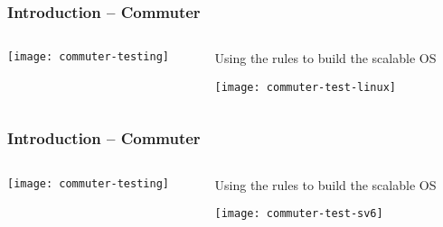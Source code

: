 \begin{frame}[plain]
	\frametitle{Introduction -- Commuter}
	
	
	\begin{columns}
		
		\begin{column}{.3\textwidth}	
			
			\texttt{[image: commuter-testing]}
			
			
		\end{column}
		
		\begin{column}{.7\textwidth}
			Using the rules to build the scalable OS
			\centering
			
			\texttt{[image: commuter-test-linux]}
			
		\end{column}
		
	\end{columns}
	
	
\end{frame}	


\begin{frame}[plain]
	\frametitle{Introduction -- Commuter}
	
	
	\begin{columns}
		
		\begin{column}{.3\textwidth}	
			
			\texttt{[image: commuter-testing]}
			
			
		\end{column}
		
		\begin{column}{.7\textwidth}
			Using the rules to build the scalable OS
			\centering
			
			\texttt{[image: commuter-test-sv6]}
			
		\end{column}
		
	\end{columns}
	
	
\end{frame}	



